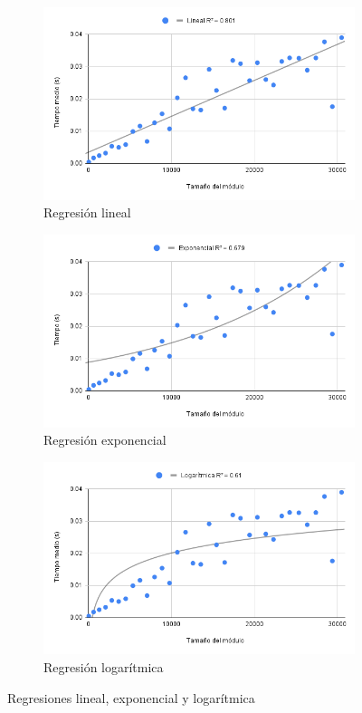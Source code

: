\begin{figure}[ht]
    \centering
    \begin{subfigure}[c]{0.6\textwidth}
        \includegraphics[width=\textwidth]{images/lineal.png}
        \caption{Regresión lineal}
    \end{subfigure}
    \begin{subfigure}[c]{0.6\textwidth}
        \includegraphics[width=\textwidth]{images/exponencial.png}
        \caption{Regresión exponencial}
    \end{subfigure}
    
    \begin{subfigure}[c]{0.6\textwidth}
        \includegraphics[width=\textwidth]{images/logaritmica.png}
        \caption{Regresión logarítmica}
    \end{subfigure}
    \caption{Regresiones lineal, exponencial y logarítmica}
    \label{im:tiempos2}
\end{figure}

